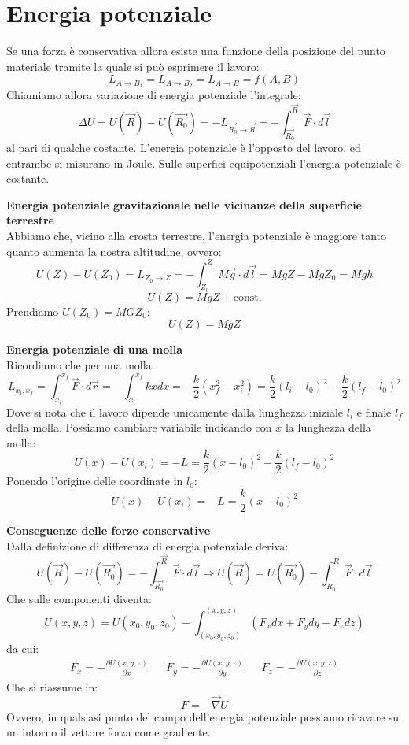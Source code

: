 \documentclass[a4paper,12pt]{article}
\begin{document}
\section{Energia potenziale}
Se una forza è conservativa allora esiste una funzione della posizione del punto materiale tramite la quale si può
esprimere il lavoro:
$$ L_{{A \rightarrow B}_1} = L_{{A \rightarrow B}_2} = L_{A\rightarrow B} = f(A,B) $$
Chiamiamo allora variazione di energia potenziale l'integrale:
$$ \Delta U = U(\vec{R}) - U(\vec{R_0}) = -L_{\vec{R_0} \rightarrow \vec{R}} = -\int_{\vec{R_0}}^{\vec{R}} \vec{F} \cdot d\vec{l} $$
al pari di qualche costante. L'energia potenziale è l'opposto del lavoro, ed entrambe si misurano in Joule.
Sulle superfici equipotenziali l'energia potenziale è costante.
\par\smallskip
\textbf{Energia potenziale gravitazionale nelle vicinanze della superficie terrestre} \\
Abbiamo che, vicino alla crosta terrestre, l'energia potenziale è maggiore tanto quanto aumenta la nostra altitudine, ovvero:
$$ U(Z) - U(Z_0) = L_{Z_0 \rightarrow Z} = -\int_{Z_0}^{Z}M\vec{g} \cdot d\vec{l} = MgZ - MgZ_0 = Mgh $$
$$ U(Z) = MgZ + \mathrm{const.} $$
Prendiamo $U(Z_0) = MGZ_0$:
$$ U(Z) = MgZ $$

\par\smallskip
\textbf{Energia potenziale di una molla} \\
Ricordiamo che per una molla:
$$ L_{x_i, x_f} = \int_{x_i}^{x_f} \vec{F} \cdot d\vec{r} = -\int_{x_i}^{x_f} kxdx = -\frac{k}{2}(x_f^2 - x_i^2) = \frac{k}{2}(l_i-l_0)^2-\frac{k}{2}(l_f-l_0)^2$$
Dove si nota che il lavoro dipende unicamente dalla lunghezza iniziale $l_i$ e finale $l_f$ della molla.
Possiamo cambiare variabile indicando con $x$ la lunghezza della molla:
$$ U(x) - U(x_i) = -L = \frac{k}{2}(x-l_0)^2-\frac{k}{2}(l_f-l_0)^2$$
Ponendo l'origine delle coordinate in $l_0$:
$$ U(x) - U(x_i) = -L = \frac{k}{2}(x-l_0)^2$$
\par\smallskip
\textbf{Conseguenze delle forze conservative} \\
Dalla definizione di differenza di energia potenziale deriva:
$$ U(\vec{R})-U(\vec{R_0}) = -\int_{\vec{R_0}}^{\vec{R}} \vec{F} \cdot d\vec{l} \Rightarrow U(\vec{R}) = U(\vec{R_0}) -\int_{R_0}^{R} \vec{F}\cdot d\vec{l} $$
Che sulle componenti diventa:
$$ U(x, y, z) = U(x_0, y_0, z_0) - \int_{(x_0, y_0, z_0)}^{(x,y,z)} (F_xdx + F_ydy + F_zdz) $$
da cui:
\begin{align*}
  F_x = - \frac{\partial U(x,y,z)}{\partial x} && F_y = - \frac{\partial U(x,y,z)}{\partial y} && F_z = - \frac{\partial U(x,y,z)}{\partial z}
\end{align*}
Che si riassume in:
$$ F = -\vec{\nabla} U$$
Ovvero, in qualsiasi punto del campo dell'energia potenziale possiamo ricavare su un intorno il vettore forza come gradiente.
\end{document}
